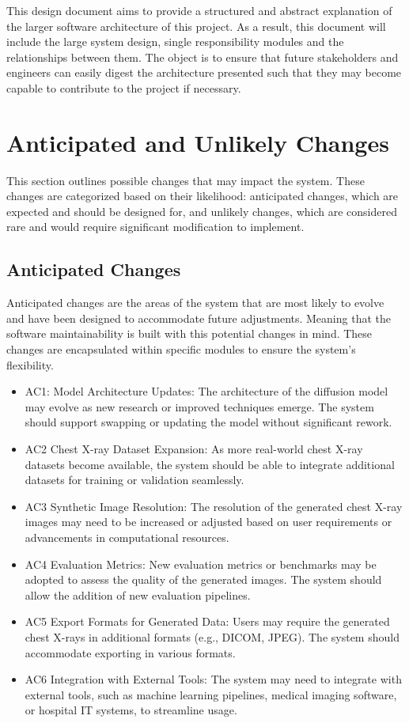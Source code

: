 \documentclass[12pt, titlepage]{article}
\begin{document}
This design document aims to provide a structured and abstract explanation of the larger software architecture of this project. As a result, this document will include the large system design, single responsibility modules and the relationships between them.
The object is to ensure that future stakeholders and engineers can easily digest the architecture presented such that they may become capable to contribute to the project if necessary.


\section{Anticipated and Unlikely Changes} \label{SecChange}

This section outlines possible changes that may impact the system. These changes are categorized based on their likelihood: anticipated changes, which are expected and should be designed for, and unlikely changes, which are considered rare and would require significant modification to implement.


\subsection{Anticipated Changes} \label{SecAchange}

Anticipated changes are the areas of the system that are most likely to evolve and have been designed to accommodate future adjustments. Meaning that the software maintainability is built with this potential changes in mind. These changes are encapsulated within specific modules to ensure the system’s flexibility.

\begin{itemize}
  \item AC1: Model Architecture Updates:
  The architecture of the diffusion model may evolve as new research or improved techniques emerge. The system should support swapping or updating the model without significant rework.
  \item AC2 Chest X-ray Dataset Expansion:
  As more real-world chest X-ray datasets become available, the system should be able to integrate additional datasets for training or validation seamlessly.
  \item AC3 Synthetic Image Resolution:
  The resolution of the generated chest X-ray images may need to be increased or adjusted based on user requirements or advancements in computational resources.
  \item AC4 Evaluation Metrics:
  New evaluation metrics or benchmarks may be adopted to assess the quality of the generated images. The system should allow the addition of new evaluation pipelines.
  \item AC5 Export Formats for Generated Data:
  Users may require the generated chest X-rays in additional formats (e.g., DICOM, JPEG). The system should accommodate exporting in various formats.
  \item AC6 Integration with External Tools:
  The system may need to integrate with external tools, such as machine learning pipelines, medical imaging software, or hospital IT systems, to streamline usage.
\end{itemize}
\end{document}
